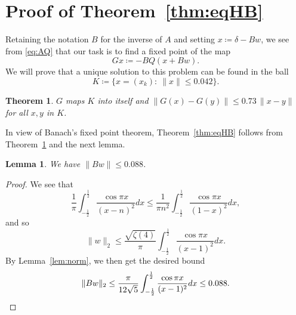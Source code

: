 \documentclass[12pt]{amsart}
\theoremstyle{plain}
\newtheorem{lemma}{Lemma}
\newtheorem{theorem}{Theorem}
\begin{document}
\section{Proof of Theorem~\ref{thm:eqHB}}
Retaining the notation $B$ for the inverse of $A$ and setting $x\coloneqq \delta - Bw$, we see from \eqref{eq:AQ} that our task is to find a fixed point of the  
map 
\[ Gx\coloneqq -BQ(x+Bw). \] 
We will prove that a unique solution to this problem can be found in the ball
\[ K\coloneqq \Big\{ x=(x_k): \  \| x \| \le 0.042 \Big\}.\]

\begin{theorem}\label{thm:contractive}
$G$ maps $K$ into itself and $\| G(x)-G(y) \| \le 0.73\, \| x-y\|$ for all $x,y$ in $K$. 
\end{theorem}

In view of Banach's fixed point theorem, Theorem~\ref{thm:eqHB} follows from Theorem~\ref{thm:contractive} and  the next lemma.

\begin{lemma}
We have $\| Bw \|\le 0.088$. \end{lemma}
\begin{proof}
We see that 
\[ \frac{1}{\pi} \int_{-\frac{1}{2}}^{\frac{1}{2}} \frac{\cos \pi x}{(x-n)^2} dx \le 
\frac{1}{\pi n^2} \int_{-\frac{1}{2}}^{\frac{1}{2}} \frac{\cos \pi x}{(1-x)^2} dx ,\]
and so 
\[ \| w \|_2 \le  \frac{\sqrt{\zeta(4)}}{\pi} \int_{-\frac{1}{2}}^{\frac{1}{2}} \frac{\cos \pi x}{(x-1)^2} dx. \]
By Lemma~\ref{lem:norm}, we then get the desired bound
\[ \| Bw \|_2 \le  \frac{\pi}{12\sqrt{5} } \int_{-\frac{1}{2}}^{\frac{1}{2}} \frac{\cos \pi x}{(x-1)^2} dx  \le 0.088. \qedhere \]
\end{proof}

\end{document}
